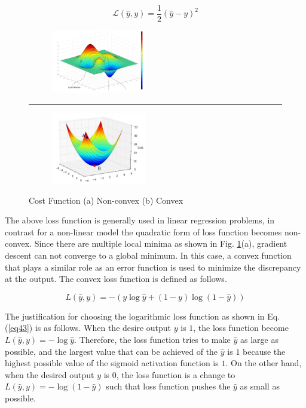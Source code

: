\begin{equation}
   \label{eq42}
   \mathcal{L}(\hat{y}, y)=\frac{1}{2}(\hat{y}-y)^{2}
\end{equation}

\begin{figure}
    \centering
        \begin{subfigure}[]
        \centering
        \includegraphics[width=0.45\textwidth]{Images/nonconvex.png}
        \end{subfigure}
        \rule{1.5px}{140px}
        \begin{subfigure}[]
        \centering
        \includegraphics[width=0.45\textwidth]{Images/convex.png}
        \end{subfigure}
    \caption{Cost Function (a) Non-convex (b) Convex \cite{Convexity}}
    \label{costfunction}
\end{figure} 

The above loss function is generally used in linear regression problems, in contrast for a non-linear model the quadratic form of loss function becomes non-convex. Since there are multiple local minima as shown in Fig. \ref{costfunction}(a), gradient descent can not converge to a global minimum. In this case, a convex function that plays a similar role as an error function is used to minimize the discrepancy at the output. The convex loss function is defined as follows. 

\begin{equation}
    {L}(\hat{y}, y)=-(y \log \hat{y}+(1-y) \log (1-\hat{y}))
    \label{eq43}
\end{equation}

The justification for choosing the logarithmic loss function as shown in Eq. (\ref{eq43}) is as follows. When the desire output $y$ is $1$, the loss function become ${L}(\hat{y}, y)=-\log \hat{y}$. Therefore, the loss function tries to make $\hat{y}$ as large as possible, and the largest value that can be achieved of the $\hat{y}$ is $1$ because the highest possible value of the sigmoid activation function is $1$. On the other hand, when the desired output $y$ is $0$, the loss function is a change to ${L}(\hat{y}, y)=-\log (1-\hat{y})$ such that loss function pushes the $\hat{y}$ as small as possible.
 
